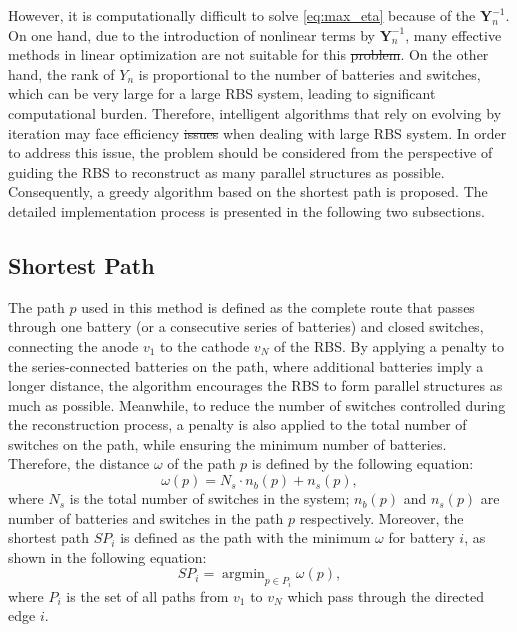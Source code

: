 \documentclass{article}
\providecommand{\DIFadd}[1]{{\protect\color{blue}\uwave{#1}}} %
\providecommand{\DIFdel}[1]{{\protect\color{red}\sout{#1}}}                      %
\providecommand{\DIFaddbegin}{} %
\providecommand{\DIFaddend}{} %
\providecommand{\DIFdelbegin}{} %
\providecommand{\DIFdelend}{} %
\newcommand{\DIFscaledelfig}{0.5}
\newlength{\DIFdelgraphicswidth} %
\newlength{\DIFdelgraphicsheight} %
\newcommand{\DIFaddincludegraphics}[2][]{{\color{blue}\fbox{\DIFOincludegraphics[#1]{#2}}}} %
\newcommand{\DIFdelincludegraphics}[2][]{%
\sbox{\DIFdelgraphicsbox}{\DIFOincludegraphics[#1]{#2}}%
\settoboxwidth{\DIFdelgraphicswidth}{\DIFdelgraphicsbox} %
\settoboxtotalheight{\DIFdelgraphicsheight}{\DIFdelgraphicsbox} %
\scalebox{\DIFscaledelfig}{%
\parbox[b]{\DIFdelgraphicswidth}{\usebox{\DIFdelgraphicsbox}\\[-\baselineskip] \rule{\DIFdelgraphicswidth}{0em}}\llap{\resizebox{\DIFdelgraphicswidth}{\DIFdelgraphicsheight}{%
\setlength{\unitlength}{\DIFdelgraphicswidth}%
\begin{picture}(1,1)%
\thicklines\linethickness{2pt} %
{\color[rgb]{1,0,0}\put(0,0){\framebox(1,1){}}}%
{\color[rgb]{1,0,0}\put(0,0){\line( 1,1){1}}}%
{\color[rgb]{1,0,0}\put(0,1){\line(1,-1){1}}}%
\end{picture}%
}\hspace*{3pt}}} %
} %
\DeclareRobustCommand{\DIFaddbegin}{\DIFOaddbegin \let\includegraphics\DIFaddincludegraphics} %
\DeclareRobustCommand{\DIFaddend}{\DIFOaddend \let\includegraphics\DIFOincludegraphics} %
\DeclareRobustCommand{\DIFdelbegin}{\DIFOdelbegin \let\includegraphics\DIFdelincludegraphics} %
\DeclareRobustCommand{\DIFdelend}{\DIFOaddend \let\includegraphics\DIFOincludegraphics} %
\begin{document}
However, it is \DIFaddbegin \DIFadd{still }\DIFaddend computationally difficult to solve \ref{eq:max_eta} because of the $\bm{Y}_n^{-1}$.
On one hand, due to the introduction of nonlinear terms by $\bm{Y}_n^{-1}$, many effective methods in linear optimization are not suitable for this \DIFdelbegin \DIFdel{problem}\DIFdelend \DIFaddbegin \DIFadd{scenario}\DIFaddend .
On the other hand, the rank of $Y_{n}$ is proportional to the number of batteries and switches, which can be very large for a large RBS system, leading to significant computational burden.
Therefore, intelligent algorithms that rely on evolving by iteration may face efficiency \DIFdelbegin \DIFdel{issues }\DIFdelend \DIFaddbegin \DIFadd{problem }\DIFaddend when dealing with large RBS system.
In order to address this issue, the problem should be considered from the perspective of guiding the RBS to reconstruct as many parallel structures as possible.
Consequently, a greedy algorithm based on the shortest path is proposed. 
The detailed implementation process is presented in the following two subsections.

\subsection{Shortest Path}

The path $p$ used in this method is defined as the complete route that passes through one battery (or a consecutive series of batteries) and closed switches, connecting the anode $v_1$ to the cathode $v_N$ of the RBS.
By applying a penalty to the series-connected batteries on the path, where additional batteries imply a longer distance, the algorithm encourages the RBS to form parallel structures as much as possible.
Meanwhile, to reduce the number of switches controlled during the reconstruction process, a penalty is also applied to the total number of switches on the path, while ensuring the minimum number of batteries.
Therefore, the distance $\omega$ of the path $p$ is defined by the following equation: 
\begin{equation}\label{eq:weight}
    \omega(p) = N_s \cdot n_b (p) + n_s (p),
\end{equation}
where $N_s$ is the total number of switches in the system; 
$n_b(p)$ and $n_s(p)$ are number of batteries and switches in the path $p$ respectively. 
Moreover, the shortest path $SP_i$ is defined as the path with the minimum $\omega$ for battery $i$, as shown in the following equation:
\begin{equation}\label{eq:def_sp}
    SP_i = \mathop{\arg\min}_{p \in P_i} \omega(p),
\end{equation}
where $P_i$ is the set of all paths from $v_1$ to $v_N$ which pass through the directed edge $i$.
\end{document}
